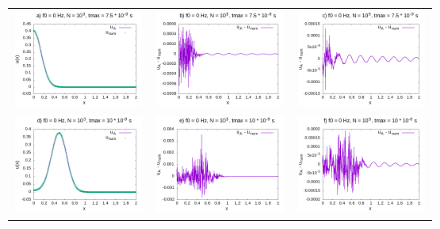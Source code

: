 \documentclass[11pt,a4paper]{report}
\begin{document}
\begin{figure}
\begin{tabular}{ccc}
  \includegraphics[width=55mm]{plots/0/mc0_3_075} &   \includegraphics[width=55mm]{plots/0/mc0_3_075_dif} &   \includegraphics[width=55mm]{plots/0/mc0_5_075_dif} \\
\includegraphics[width=55mm]{plots/0/mc0_3_10} &   \includegraphics[width=55mm]{plots/0/mc0_3_10_dif} &   \includegraphics[width=55mm]{plots/0/mc0_5_10_dif} \\

\end{tabular}
\end{figure}
\end{document}
